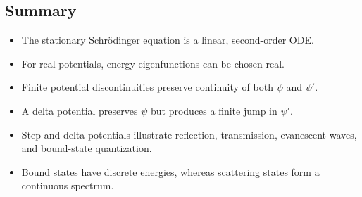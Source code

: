 \subsection{Summary}
\begin{itemize}
 \item The stationary Schr\"odinger equation is a linear, second-order ODE.
 \item For real potentials, energy eigenfunctions can be chosen real.
 \item Finite potential discontinuities preserve continuity of both $\psi$
       and $\psi'$.
 \item A delta potential preserves $\psi$ but produces a finite jump in
       $\psi'$.
 \item Step and delta potentials illustrate reflection, transmission,
       evanescent waves, and bound-state quantization.
 \item Bound states have discrete energies, whereas scattering states form a
       continuous spectrum.
\end{itemize}

